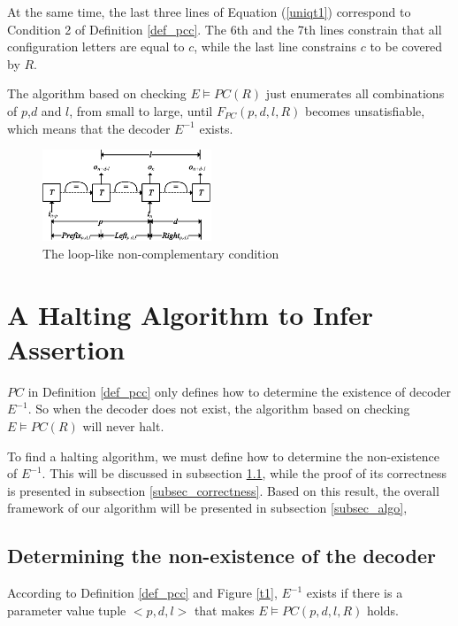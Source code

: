 \documentclass{sig-alternate}
\begin{document}
At the same time,
the last three lines of Equation (\ref{uniqt1}) correspond to Condition 2 of Definition \ref{def_pcc}.
The 6th and the 7th lines constrain that all configuration letters are equal to $c$,
while the last line constrains $c$ to be covered by $R$.

The algorithm based on checking $E\vDash PC(R)$\cite{ShengYuShen:iccad09,ShengYuShen:tcad} just enumerates all combinations of $p$,$d$ and $l$,
from small to large,
until $F_{PC}(p,d,l,R)$ becomes unsatisfiable,
which means that the decoder $E^{-1}$ exists.

\begin{figure}[b]
\begin{center}
\includegraphics[width=0.45\textwidth]{doubleloop}
\end{center}
\caption{The loop-like non-complementary condition}
  \label{fig_double_loop}
\end{figure}

\section{A Halting Algorithm to Infer Assertion}\label{sec_exist}
$PC$ in Definition \ref{def_pcc} only defines how to determine the existence of decoder $E^{-1}$.
So when the decoder does not exist,
the algorithm based on checking $E\vDash PC(R)$\cite{ShengYuShen:iccad09,ShengYuShen:tcad} will never halt.

To find a halting algorithm,
we must define how to determine the non-existence of $E^{-1}$.
This will be discussed in subsection \ref{subsec_chknonext},
while the proof of its correctness is presented in subsection \ref{subsec_correctness}.
Based on this result,
the overall framework of our algorithm will be presented in subsection \ref{subsec_algo},

\subsection{Determining the non-existence of the decoder}\label{subsec_chknonext}


According to Definition \ref{def_pcc} and Figure \ref{t1},
$E^{-1}$ exists if there is a parameter value tuple $<p,d,l>$ that makes
$E\vDash PC(p,d,l,R)$ holds.
\end{document}
